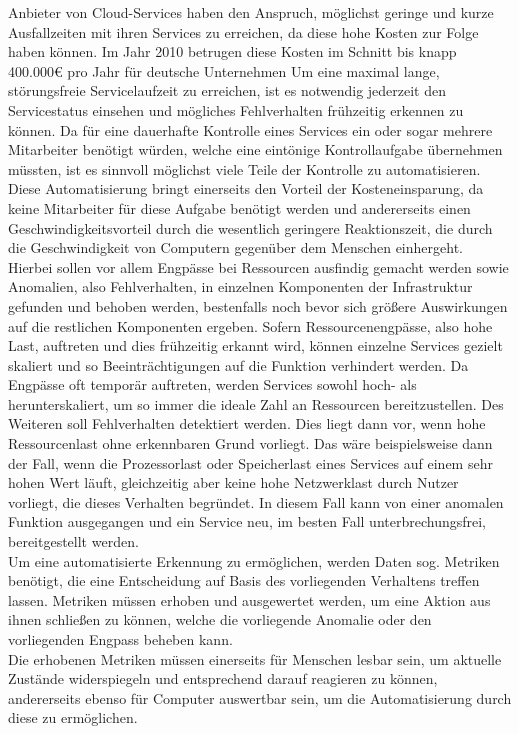 \documentclass[a4paper,10pt]{scrartcl}
\begin{document}
Anbieter von Cloud-Services haben den Anspruch, möglichst geringe und kurze Ausfallzeiten mit ihren Services zu erreichen, da diese hohe Kosten zur Folge haben können. Im Jahr 2010 betrugen diese Kosten im Schnitt bis knapp 400.000€ \cite{CA-Studie} pro Jahr für deutsche Unternehmen Um eine maximal lange, störungsfreie Servicelaufzeit zu erreichen, ist es notwendig jederzeit den Servicestatus einsehen und mögliches Fehlverhalten frühzeitig erkennen zu können. 
Da für eine dauerhafte Kontrolle eines Services ein oder sogar mehrere Mitarbeiter benötigt würden, welche eine eintönige Kontrollaufgabe übernehmen müssten, ist es sinnvoll möglichst viele Teile der Kontrolle zu automatisieren. Diese Automatisierung bringt einerseits den Vorteil der Kosteneinsparung, da keine Mitarbeiter für diese Aufgabe benötigt werden und andererseits einen Geschwindigkeitsvorteil durch die wesentlich geringere Reaktionszeit, die durch die Geschwindigkeit von Computern gegenüber dem Menschen einhergeht.\\
Hierbei sollen vor allem Engpässe bei Ressourcen ausfindig gemacht werden sowie Anomalien, also Fehlverhalten, in einzelnen Komponenten der Infrastruktur gefunden und behoben werden, bestenfalls noch bevor sich größere Auswirkungen auf die restlichen Komponenten ergeben.
Sofern Ressourcenengpässe, also hohe Last, auftreten und dies frühzeitig erkannt wird, können einzelne Services gezielt skaliert und so Beeinträchtigungen auf die Funktion verhindert werden. Da Engpässe oft temporär auftreten, werden Services sowohl hoch- als herunterskaliert, um so immer die ideale Zahl an Ressourcen bereitzustellen.
Des Weiteren soll Fehlverhalten detektiert werden. Dies liegt dann vor, wenn hohe Ressourcenlast ohne erkennbaren Grund vorliegt. Das wäre beispielsweise dann der Fall, wenn die Prozessorlast oder Speicherlast eines Services auf einem sehr hohen Wert läuft, gleichzeitig aber keine hohe Netzwerklast durch Nutzer vorliegt, die dieses Verhalten begründet. In diesem Fall kann von einer anomalen Funktion ausgegangen und ein Service neu, im besten Fall unterbrechungsfrei, bereitgestellt werden. \\
Um eine automatisierte Erkennung zu ermöglichen, werden Daten sog. Metriken benötigt, die eine Entscheidung auf Basis des vorliegenden Verhaltens treffen lassen. Metriken müssen erhoben und ausgewertet werden, um eine Aktion aus ihnen schließen zu können, welche die vorliegende Anomalie oder den vorliegenden Engpass beheben kann.\\
Die erhobenen Metriken müssen einerseits für Menschen lesbar sein, um aktuelle Zustände widerspiegeln und entsprechend darauf reagieren zu können, andererseits ebenso für Computer auswertbar sein, um die Automatisierung durch diese zu ermöglichen.\\
\end{document}
